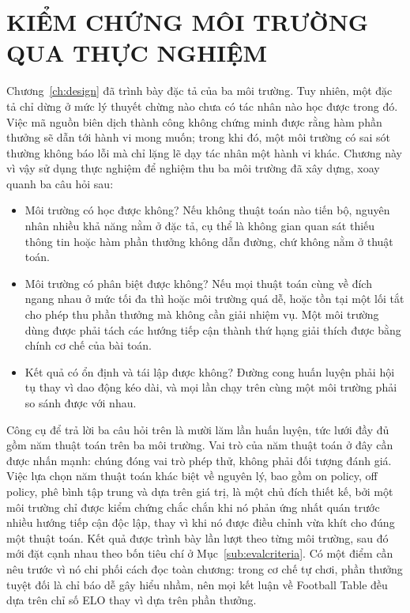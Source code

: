 \fontsize{13pt}{22.5pt}\selectfont

\clearpage
\section{KIỂM CHỨNG MÔI TRƯỜNG QUA THỰC NGHIỆM}
\label{ch:results}

\indent Chương~\ref{ch:design} đã trình bày đặc tả của ba môi trường. Tuy nhiên, một đặc
tả chỉ dừng ở mức lý thuyết chừng nào chưa có tác nhân nào học được trong đó. Việc mã
nguồn biên dịch thành công không chứng minh được rằng hàm phần thưởng sẽ dẫn tới hành vi
mong muốn; trong khi đó, một môi trường có sai sót thường không báo lỗi mà chỉ lặng lẽ dạy
tác nhân một hành vi khác. Chương này vì vậy sử dụng thực nghiệm để nghiệm thu ba môi
trường đã xây dựng, xoay quanh ba câu hỏi sau:

\begin{itemize}
    \item Môi trường có học được không? Nếu không thuật toán nào tiến bộ, nguyên
    nhân nhiều khả năng nằm ở đặc tả, cụ thể là không gian quan sát thiếu thông tin hoặc
    hàm phần thưởng không dẫn đường, chứ không nằm ở thuật toán.
    \item Môi trường có phân biệt được không? Nếu mọi thuật toán cùng về đích
    ngang nhau ở mức tối đa thì hoặc môi trường quá dễ, hoặc tồn tại một lối tắt cho phép
    thu phần thưởng mà không cần giải nhiệm vụ. Một môi trường dùng được phải tách các
    hướng tiếp cận thành thứ hạng giải thích được bằng chính cơ chế của bài toán.
    \item Kết quả có ổn định và tái lập được không? Đường cong huấn luyện phải hội
    tụ thay vì dao động kéo dài, và mọi lần chạy trên cùng một môi trường phải so sánh được
    với nhau.
\end{itemize}

\indent Công cụ để trả lời ba câu hỏi trên là mười lăm lần huấn luyện, tức lưới đầy đủ gồm
năm thuật toán trên ba môi trường. Vai trò của năm thuật toán ở đây cần được nhấn mạnh:
chúng đóng vai trò phép thử, không phải đối tượng đánh giá. Việc lựa
chọn năm thuật toán khác biệt về nguyên lý, bao gồm on policy, off policy, phê bình tập
trung và dựa trên giá trị, là một chủ đích thiết kế, bởi một môi trường chỉ được kiểm
chứng chắc chắn khi nó phản ứng nhất quán trước nhiều hướng tiếp cận độc lập, thay vì khi
nó được điều chỉnh vừa khít cho đúng một thuật toán. Kết quả được trình bày lần lượt theo
từng môi trường, sau đó mới đặt cạnh nhau theo bốn tiêu chí ở
Mục~\ref{sub:evalcriteria}. Có một điểm cần nêu trước vì nó chi phối cách đọc toàn chương:
trong cơ chế tự chơi, phần thưởng tuyệt đối là chỉ báo dễ gây hiểu nhầm, nên mọi kết luận
về Football Table đều dựa trên chỉ số ELO thay vì dựa trên phần thưởng.

